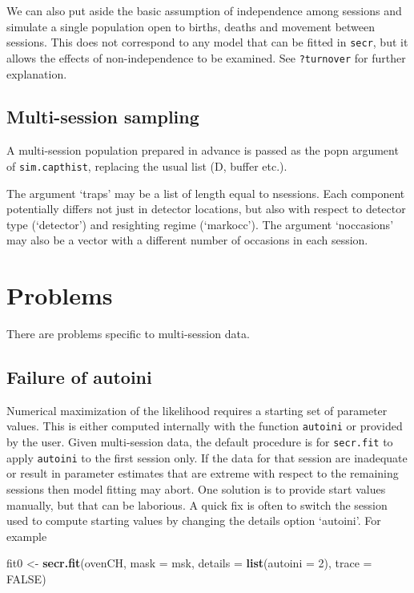 \documentclass[
]{book}
\newenvironment{Shaded}{\begin{snugshade}}{\end{snugshade}}
\newcommand{\AttributeTok}[1]{\textcolor[rgb]{0.13,0.29,0.53}{#1}}
\newcommand{\ConstantTok}[1]{\textcolor[rgb]{0.56,0.35,0.01}{#1}}
\newcommand{\DecValTok}[1]{\textcolor[rgb]{0.00,0.00,0.81}{#1}}
\newcommand{\FunctionTok}[1]{\textcolor[rgb]{0.13,0.29,0.53}{\textbf{#1}}}
\newcommand{\NormalTok}[1]{#1}
\newcommand{\OtherTok}[1]{\textcolor[rgb]{0.56,0.35,0.01}{#1}}
\begin{document}
We can also put aside the basic assumption of independence among sessions and simulate a single population open to births, deaths and movement between sessions. This does not correspond to any model that can be fitted in \texttt{secr}, but it allows the effects of non-independence to be examined. See \texttt{?turnover} for further explanation.

\subsection{Multi-session sampling}\label{multi-session-sampling}

A multi-session population prepared in advance is passed as the popn argument of \texttt{sim.capthist}, replacing the usual list (D, buffer etc.).

The argument `traps' may be a list of length equal to nsessions. Each component potentially differs not just in detector locations, but also with respect to detector type (`detector') and resighting regime (`markocc'). The argument `noccasions' may also be a vector with a different number of occasions in each session.

\section{Problems}\label{problems}

There are problems specific to multi-session data.

\subsection{Failure of autoini}\label{failure-of-autoini}

Numerical maximization of the likelihood requires a starting set of parameter values. This is either computed internally with the function \texttt{autoini} or provided by the user. Given multi-session data, the default procedure is for \texttt{secr.fit} to apply \texttt{autoini} to the first session only. If the data for that session are inadequate or result in parameter estimates that are extreme with respect to the remaining sessions then model fitting may abort. One solution is to provide start values manually, but that can be laborious. A quick fix is often to switch the session used to compute starting values by changing the details option `autoini'. For example

\begin{Shaded}
\begin{Highlighting}[]
\NormalTok{fit0 }\OtherTok{\textless{}{-}} \FunctionTok{secr.fit}\NormalTok{(ovenCH, }\AttributeTok{mask =}\NormalTok{ msk, }\AttributeTok{details =} \FunctionTok{list}\NormalTok{(}\AttributeTok{autoini =} \DecValTok{2}\NormalTok{), }\AttributeTok{trace =} \ConstantTok{FALSE}\NormalTok{)}
\end{Highlighting}
\end{Shaded}
\end{document}
